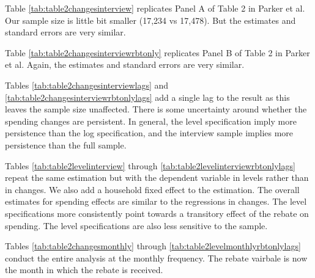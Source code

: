 Table \ref{tab:table2changesinterview} replicates Panel A of Table 2 in Parker et al. 
Our sample size is little bit smaller (17,234 vs 17,478). But the estimates and standard errors are very similar.

Table \ref{tab:table2changesinterviewrbtonly} replicates Panel B of Table 2 in Parker et al. 
Again, the estimates and standard errors are very similar.

Tables \ref{tab:table2changesinterviewlags} and \ref{tab:table2changesinterviewrbtonlylags} 
add a single lag to the result as this leaves the sample size unaffected. 
There is some uncertainty around whether the spending changes are persistent.
In general, the level specification imply more persistence than the log specification,
and the interview sample implies more persistence than the full sample.

Tables \ref{tab:table2levelinterview} through \ref{tab:table2levelinterviewrbtonlylags} 
repeat the same estimation but with the dependent variable in levels rather than in
changes. We also add a household fixed effect to the estimation. The overall estimates
for spending effects are similar to the regressions in changes. The level specifications
more consistently point towards a transitory effect of the rebate on spending. The level
specifications are also less sensitive to the sample.


Tables \ref{tab:table2changesmonthly} through \ref{tab:table2levelmonthlyrbtonlylags} 
conduct the entire analysis at the monthly frequency. The rebate vairbale is
now the month in which the rebate is received.

\begin{landscape}




















% 
% 
% 
% 

% 
% 
% 
% 

\end{landscape}
